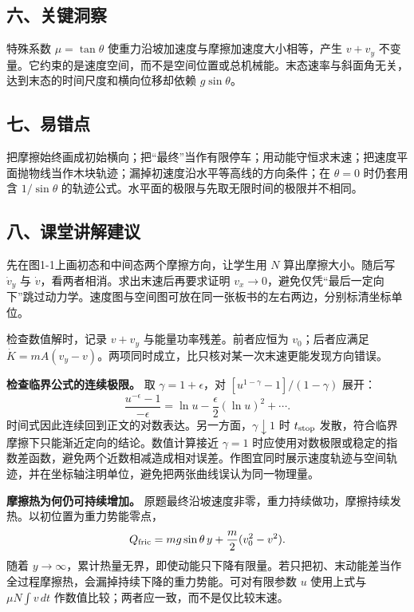 \documentclass[12pt,a4paper,UTF8]{ctexart}
\begin{document}
\subsection{六、关键洞察}\label{ux516dux5173ux952eux6d1eux5bdf}

特殊系数 \(\mu=\tan\theta\) 使重力沿坡加速度与摩擦加速度大小相等，产生
\(v+v_y\)
不变量。它约束的是速度空间，而不是空间位置或总机械能。末态速率与斜面角无关，达到末态的时间尺度和横向位移却依赖
\(g\sin\theta\)。

\subsection{七、易错点}\label{ux4e03ux6613ux9519ux70b9}

把摩擦始终画成初始横向；把``最终''当作有限停车；用动能守恒求末速；把速度平面抛物线当作木块轨迹；漏掉初速度沿水平等高线的方向条件；在
\(\theta=0\) 时仍套用含 \(1/\sin\theta\)
的轨迹公式。水平面的极限与先取无限时间的极限并不相同。

\subsection{八、课堂讲解建议}\label{ux516bux8bfeux5802ux8bb2ux89e3ux5efaux8bae}

先在图1-1上画初态和中间态两个摩擦方向，让学生用 \(N\)
算出摩擦大小。随后写 \(\dot v_y\) 与
\(\dot v\)，看两者相消。求出末速后再要求证明
\(v_x\to0\)，避免仅凭``最后一定向下''跳过动力学。速度图与空间图可放在同一张板书的左右两边，分别标清坐标单位。

检查数值解时，记录 \(v+v_y\) 与能量功率残差。前者应恒为
\(v_0\)；后者应满足
\(\dot K=mA(v_y-v)\)。两项同时成立，比只核对某一次末速更能发现方向错误。

\textbf{检查临界公式的连续极限。} 取 \(\gamma=1+\epsilon\)，对
\([u^{1-\gamma}-1]/(1-\gamma)\) 展开： \[
\frac{u^{-\epsilon}-1}{-\epsilon}
=\ln u-\frac{\epsilon}{2}(\ln u)^2+\cdots.
\] 时间式因此连续回到正文的对数表达。另一方面，\(\gamma\downarrow1\) 时
\(t_{\rm stop}\) 发散，符合临界摩擦下只能渐近定向的结论。数值计算接近
\(\gamma=1\)
时应使用对数极限或稳定的指数差函数，避免两个近数相减造成相对误差。作图宜同时展示速度轨迹与空间轨迹，并在坐标轴注明单位，避免把两张曲线误认为同一物理量。

\textbf{摩擦热为何仍可持续增加。}
原题最终沿坡速度非零，重力持续做功，摩擦持续发热。以初位置为重力势能零点，
\[
Q_{\rm fric}=mg\sin\theta\,y+\frac m2(v_0^2-v^2).
\] 随着
\(y\to\infty\)，累计热量无界，即使动能只下降有限量。若只把初、末动能差当作全过程摩擦热，会漏掉持续下降的重力势能。可对有限参数
\(u\) 使用上式与 \(\mu N\int v\,dt\)
作数值比较；两者应一致，而不是仅比较末速。
\end{document}
